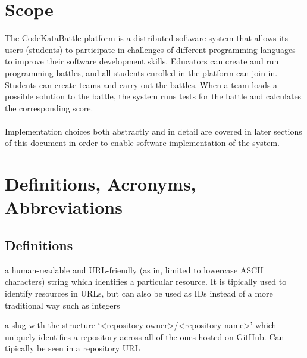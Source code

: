 \section{Scope}
The CodeKataBattle platform is a distributed software system that allows its users (students) to participate in challenges of different programming languages to improve their software development skills.
Educators can create and run programming battles, and all students enrolled in the platform can join in.
Students can create teams and carry out the battles.
When a team loads a possible solution to the battle, the system runs tests for the battle and calculates the corresponding score.
\\\\
Implementation choices both abstractly and in detail are covered in later sections of this document in order to enable software implementation of the system.

\section{Definitions, Acronyms, Abbreviations}

\subsection{Definitions}
\begin{description}[leftmargin=0pt]
    \item[Slug:] a human-readable and URL-friendly (as in, limited to lowercase ASCII characters) string which
          identifies a particular resource. It is tipically used to identify resources in URLs, but can also be used
          as IDs instead of a more traditional way such as integers
    \item[GitHub Repository Slug:] a slug with the structure `<repository owner>/<repository name>' which uniquely
          identifies a repository across all of the ones hosted on GitHub. Can tipically be seen in a repository URL
\end{description}

